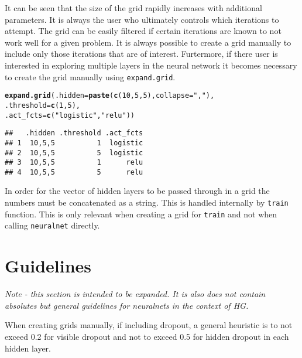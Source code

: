 \documentclass[12pt]{article}\usepackage[]{graphicx}\usepackage[]{color}
\makeatletter
\newcommand{\hlnum}[1]{\textcolor[rgb]{0.686,0.059,0.569}{#1}}%
\newcommand{\hlstr}[1]{\textcolor[rgb]{0.192,0.494,0.8}{#1}}%
\newcommand{\hlstd}[1]{\textcolor[rgb]{0.345,0.345,0.345}{#1}}%
\newcommand{\hlkwc}[1]{\textcolor[rgb]{0.333,0.667,0.333}{#1}}%
\newcommand{\hlkwd}[1]{\textcolor[rgb]{0.737,0.353,0.396}{\textbf{#1}}}%
\newenvironment{kframe}{%
 \def\at@end@of@kframe{}%
 \ifinner\ifhmode%
  \def\at@end@of@kframe{\end{minipage}}%
  \begin{minipage}{\columnwidth}%
 \fi\fi%
 \def\FrameCommand##1{\hskip\@totalleftmargin \hskip-\fboxsep
 \colorbox{shadecolor}{##1}\hskip-\fboxsep
     \hskip-\linewidth \hskip-\@totalleftmargin \hskip\columnwidth}%
 \MakeFramed {\advance\hsize-\width
   \@totalleftmargin\z@ \linewidth\hsize
   \@setminipage}}%
 {\par\unskip\endMakeFramed%
 \at@end@of@kframe}
\newenvironment{knitrout}{}{} %
\newcommand{\Rcode}[1]{\texttt{#1}}
\newcommand{\Rfunction}[1]{\Rcode{#1}}
\makeatother
\begin{document}
It can be seen that the size of the grid rapidly increases with additional parameters.  It
is always the user who ultimately controls which iterations to attempt.  The grid can be easily
filtered if certain iterations are known to not work well for a given problem.  It is always 
possible to create a grid manually to include only those iterations that are of interest.
Furtermore, if there user is interested in exploring multiple layers in the neural network it becomes
necessary to create the grid manually using \Rfunction{expand.grid}.

\begin{knitrout}
\color{fgcolor}\begin{kframe}
\begin{alltt}
\hlkwd{expand.grid}\hlstd{(}\hlkwc{.hidden} \hlstd{=} \hlkwd{paste}\hlstd{(}\hlkwd{c}\hlstd{(}\hlnum{10}\hlstd{,}\hlnum{5}\hlstd{,}\hlnum{5}\hlstd{),} \hlkwc{collapse}\hlstd{=}\hlstr{","}\hlstd{),}
            \hlkwc{.threshold} \hlstd{=} \hlkwd{c}\hlstd{(}\hlnum{1}\hlstd{,}\hlnum{5}\hlstd{),}
            \hlkwc{.act_fcts} \hlstd{=} \hlkwd{c}\hlstd{(}\hlstr{"logistic"}\hlstd{,} \hlstr{"relu"}\hlstd{))}
\end{alltt}
\begin{verbatim}
##   .hidden .threshold .act_fcts
## 1  10,5,5          1  logistic
## 2  10,5,5          5  logistic
## 3  10,5,5          1      relu
## 4  10,5,5          5      relu
\end{verbatim}
\end{kframe}
\end{knitrout}

In order for the vector of hidden layers to be passed through in a grid the numbers must
be concatenated as a string.  This is handled internally by \Rfunction{train} function.  
This is only relevant when creating a grid for \Rfunction{train} and not when calling
\Rfunction{neuralnet} directly.

\maketitle
\section{Guidelines}

\textit{Note - this section is intended to be expanded. It is also does not contain absolutes but general guidelines for neuralnets in the context of HG.}
\newline

When creating grids manually, if including dropout, a general heuristic is to not exceed 0.2 for visible dropout and not to exceed 0.5 for hidden dropout in each hidden layer.
\end{document}

